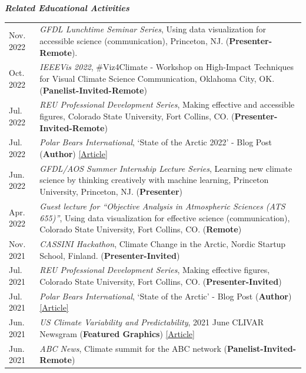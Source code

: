 \documentclass[margin,line,palatino,courier,10pt]{res}
\begin{document}
\begin{resume}
\textit{\textbf{Related Educational Activities}}
\vspace*{0.05in}\\
\begin{tabular}{@{}p{0.9in}p{4in}}
Nov. 2022 & \textit{GFDL Lunchtime Seminar Series}, Using data visualization for accessible science (communication), Princeton, NJ. (\textbf{Presenter-Remote}).\\
Oct. 2022 & \textit{IEEEVis 2022}, \#Viz4Climate - Workshop on High-Impact Techniques for Visual Climate Science Communication, Oklahoma City, OK. (\textbf{Panelist-Invited-Remote})\\
Jul. 2022 & \textit{REU Professional Development Series}, Making effective and accessible figures, Colorado State University, Fort Collins, CO. (\textbf{Presenter-Invited-Remote})\\
Jul. 2022 & \textit{Polar Bears International}, `State of the Arctic 2022' - Blog Post (\textbf{Author}) \href{https://polarbearsinternational.org/news-media/articles/arctic-sea-ice-conditions-2022}{[Article]}\\
Jun. 2022 & \textit{GFDL/AOS Summer Internship Lecture Series}, Learning new climate science by thinking creatively with machine learning, Princeton University, Princeton, NJ. (\textbf{Presenter})\\
Apr. 2022 & \textit{Guest lecture for ``Objective Analysis in Atmospheric Sciences (ATS 655)''}, Using data visualization for effective science (communication), Colorado State University, Fort Collins, CO. (\textbf{Remote})\\
Nov. 2021 & \textit{CASSINI Hackathon}, Climate Change in the Arctic, Nordic Startup School, Finland. (\textbf{Presenter-Invited})\\
Jul. 2021 & \textit{REU Professional Development Series}, Making effective figures, Colorado State University, Fort Collins, CO. (\textbf{Presenter-Invited})\\
Jul. 2021 & \textit{Polar Bears International}, `State of the Arctic' - Blog Post (\textbf{Author}) \href{https://polarbearsinternational.org/news/article-climate-change/state-of-the-arctic/}{[Article]}\\
Jun. 2021 & \textit{US Climate Variability and Predictability}, 2021 June CLIVAR Newsgram (\textbf{Featured Graphics}) \href{https://mailchi.mp/usclivar/newsgram-2021june}{[Article]}\\
Jun. 2021 & \textit{ABC News}, Climate summit for the ABC network (\textbf{Panelist-Invited-Remote})\\

\end{tabular}
\end{resume}
\end{document}
